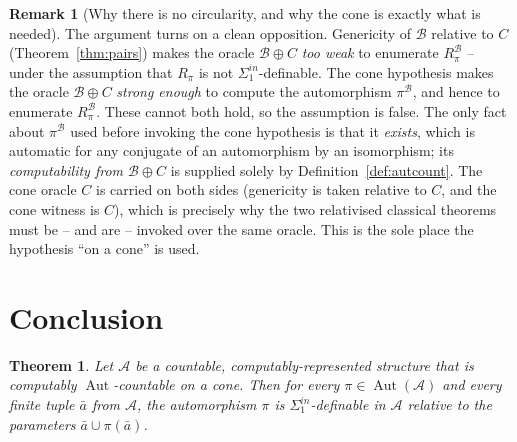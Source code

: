 \documentclass{article}
\newcommand{\A}{\mathcal{A}}
\newcommand{\B}{\mathcal{B}}
\newcommand{\AUT}{\operatorname{Aut}}
\newcommand{\Sin}{\Sigma^{in}_1}
\newcommand{\bara}{\bar a}
\theoremstyle{plain}
\newtheorem{theorem}{Theorem}
\theoremstyle{definition}
\newtheorem{remark}{Remark}
\begin{document}
\begin{remark}[Why there is no circularity, and why the cone is exactly what is needed]
The argument turns on a clean opposition. Genericity of $\B$ relative to $C$
(Theorem~\ref{thm:pairs}) makes the oracle $\B\oplus C$ \emph{too weak} to enumerate
$R_\pi^\B$ -- under the assumption that $R_\pi$ is not $\Sin$-definable. The cone
hypothesis makes the oracle $\B\oplus C$ \emph{strong enough} to compute the
automorphism $\pi^\B$, and hence to enumerate $R_\pi^\B$. These cannot both hold, so
the assumption is false. The only fact about $\pi^\B$ used before invoking the cone
hypothesis is that it \emph{exists}, which is automatic for any conjugate of an
automorphism by an isomorphism; its \emph{computability from $\B\oplus C$} is supplied
solely by Definition~\ref{def:autcount}. The cone oracle $C$ is carried on both sides
(genericity is taken relative to $C$, and the cone witness is $C$), which is precisely
why the two relativised classical theorems must be -- and are -- invoked over the same
oracle. This is the sole place the hypothesis ``on a cone'' is used.
\end{remark}

\section{Conclusion}

\begin{theorem}\label{thm:result}
Let $\A$ be a countable, computably-represented structure that is computably
$\AUT$-countable on a cone. Then for every $\pi\in\AUT(\A)$ and every finite tuple
$\bara$ from $\A$, the automorphism $\pi$ is $\Sin$-definable in $\A$ relative to the
parameters $\bara\cup\pi(\bara)$.
\end{theorem}
\end{document}
